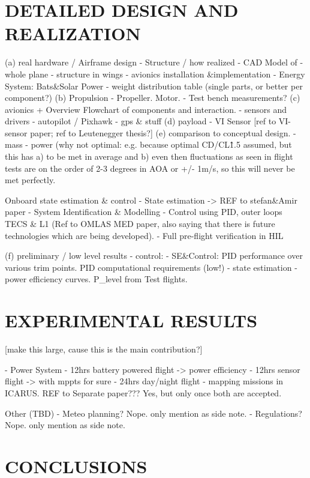 \documentclass[letterpaper, 10 pt, conference]{ieeeconf}  %
\begin{document}
\section{DETAILED DESIGN AND REALIZATION}

(a) real hardware / Airframe design
  - Structure / how realized
  - CAD Model of
  	- whole plane
  	- structure in wings
  	- avionics installation \&implementation
   - Energy System: Bats\&Solar Power
   - weight distribution table (single parts, or better per component?)
(b) Propulsion
  - Propeller. Motor.
  - Test bench measurements?
(c) avionics
 + Overview Flowchart of components and interaction.
   - sensors and drivers
   - autopilot / Pixhawk
   - gps \& stuff
(d) payload
  - VI Sensor [ref to VI-sensor paper; ref to Leutenegger thesis?]
(e) comparison to conceptual design.
  - mass
   - power (why not optimal: e.g. because optimal CD/CL\^1.5 assumed, but this has a) to be met in average and b) even then fluctuations as seen in flight tests are on the order of 2-3 degrees in AOA or +/- 1m/s, so this will never be met perfectly.

Onboard state estimation \& control
 - State estimation -> REF to stefan\&Amir paper
 - System Identification \& Modelling
 - Control using PID,  outer loops TECS \& L1 (Ref to OMLAS MED paper, also saying that there is future technologies which are being developed).
 - Full pre-flight verification in HIL
 
 (f) preliminary / low level results
  - control:   - SE\&Control: PID performance over various trim points. PID computational requirements (low!)
  - state estimation
   - power efficiency curves. P\_level from Test flights.
 
 \section{EXPERIMENTAL RESULTS}
 
 [make this large, cause this is the main contribution?]

  - Power System
  - 12hrs battery powered flight -> power efficiency
  - 12hrs sensor flight -> with mppts for sure
  - 24hrs day/night flight
  - mapping missions in ICARUS. REF to Separate paper??? Yes, but only once both are accepted.
    
 Other (TBD)
  - Meteo planning? Nope. only mention as side note.
  - Regulations? Nope. only mention as side note.
   
\section{CONCLUSIONS}
\end{document}
